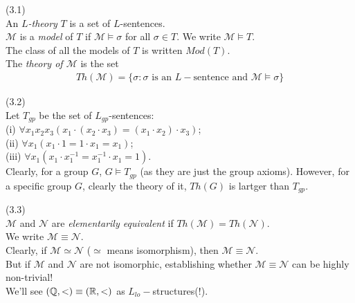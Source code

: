 \documentclass[a4paper]{article}
\begin{document}
\begin{defi} (3.1)\\
    An \emph{$L$-theory} $T$ is a set of $L$-sentences.\\
    $\mathcal{M}$ is a \emph{model} of $T$ if $\mathcal{M} \vDash \sigma$ for all $\sigma \in T$. We write $\mathcal{M} \vDash T$.\\
    The class of all the models of $T$ is written $Mod(T)$.\\
    The \emph{theory of $\mathcal{M}$} is the set 
    \begin{equation*}
        \begin{aligned}
            Th(\mathcal{M}) = \{\sigma:\sigma \text{ is an } L-\text{sentence and } \mathcal{M} \vDash \sigma\}
        \end{aligned}
    \end{equation*}
\end{defi}

\begin{eg} (3.2)\\
    Let $T_{gp}$ be the set of $L_{gp}$-sentences:\\
    (i) $\forall x_1x_2x_3 (x_1 \cdot (x_2 \cdot x_3) = (x_1\cdot x_2) \cdot x_3)$;\\
    (ii) $\forall x_1 (x_1 \cdot 1 = 1 \cdot x_1 = x_1)$;\\
    (iii) $\forall x_1 (x_1 \cdot x_1^{-1} = x_1^{-1} \cdot x_1 = 1)$.\\
    Clearly, for a group $G$, $G \vDash T_{gp}$ (as they are just the group axioms). However, for a specific group $G$, clearly the theory of it, $Th(G)$ is lartger than $T_{gp}$.
\end{eg}

\begin{defi} (3.3)\\
    $\mathcal{M}$ and $\mathcal{N}$ are \emph{elementarily equivalent} if $Th(\mathcal{M}) = Th(\mathcal{N})$.\\
    We write $\mathcal{M} \equiv \mathcal{N}$.\\
    Clearly, if $\mathcal{M} \simeq \mathcal{N}$ ($\simeq$ means isomorphism), then $\mathcal{M} \equiv \mathcal{N}$.\\
    But if $\mathcal{M}$ and $\mathcal{N}$ are not isomorphic, establishing whether $\mathcal{M} \equiv \mathcal{N}$ can be highly non-trivial!\\
    We'll see $(\mathbb{Q},<) \equiv (\mathbb{R},<)$ as $L_{lo}-$structures(!).
\end{defi}
\end{document}
